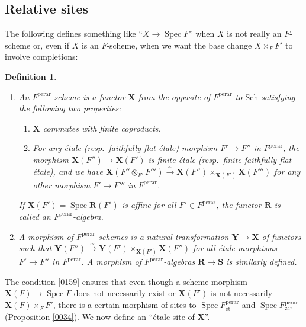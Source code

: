 \documentclass{amsart}
\newtheorem{Def}[Thm]{Definition}
\theoremstyle{remark}
\numberwithin{equation}{subsection}
\newcommand{\isomto}{\overset{\sim}{\to}}
\newcommand{\tensor}{\mathbin{\otimes}}
\newcommand{\et}{\mathrm{et}}
\newcommand{\zar}{\mathrm{zar}}
\newcommand{\perar}{\mathrm{perar}}
\newcommand{\alg}[1]{\mathbf{#1}}
\newcommand{\Sch}{\mathrm{Sch}}
\DeclareMathOperator{\Spec}{Spec}
\begin{document}

\subsection{Relative sites}

The following defines something like ``$X \to \Spec F$''
when $X$ is not really an $F$-scheme
or, even if $X$ is an $F$-scheme,
when we want the base change $X \times_{F} F'$ to involve completions:

\begin{Def} \mbox{} \label{0312}
	\begin{enumerate}
		\item
			An \emph{$F^{\perar}$-scheme} is
			a functor $\alg{X}$ from the opposite of $F^{\perar}$ to $\Sch$
			satisfying the following two properties:
			\begin{enumerate}
				\item \label{0158}
					$\alg{X}$ commutes with finite coproducts.
				\item \label{0159}
					For any \'etale (resp.\ faithfully flat \'etale) morphism $F' \to F''$ in $F^{\perar}$,
					the morphism $\alg{X}(F'') \to \alg{X}(F')$ is
					finite \'etale (resp.\ finite faithfully flat \'etale),
					and we have $\alg{X}(F'' \tensor_{F'} F''') \isomto \alg{X}(F'') \times_{\alg{X}(F')} \alg{X}(F''')$
					for any other morphism $F' \to F'''$ in $F^{\perar}$.
			\end{enumerate}
			If $\alg{X}(F') = \Spec \alg{R}(F')$ is affine for all $F' \in F^{\perar}$,
			the functor $\alg{R}$ is called an \emph{$F^{\perar}$-algebra}.
		\item
			A morphism of $F^{\perar}$-schemes
			is a natural transformation $\alg{Y} \to \alg{X}$ of functors such that
			$\alg{Y}(F'') \isomto \alg{Y}(F') \times_{\alg{X}(F')} \alg{X}(F'')$
			for all \'etale morphisms $F' \to F''$ in $F^{\perar}$.
			A morphism of $F^{\perar}$-algebras $\alg{R} \to \alg{S}$ is similarly defined.
	\end{enumerate}
\end{Def}

The condition \eqref{0159} ensures that even though a scheme morphism
$\alg{X}(F) \to \Spec F$ does not necessarily exist or
$\alg{X}(F')$ is not necessarily $\alg{X}(F) \times_{F} F'$,
there is a certain morphism of sites
to $\Spec F^{\perar}_{\et}$ and $\Spec F^{\perar}_{\zar}$
(Proposition \ref{0034}).
We now define an ``\'etale site of $\alg{X}$''.
\end{document}
